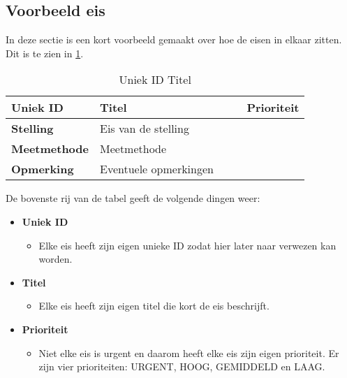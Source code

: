 \newpage

\subsection{Voorbeeld eis}

In deze sectie is een kort voorbeeld gemaakt over hoe de eisen in elkaar zitten. Dit is te zien in \ref{tab:Uniek ID}.

\newcommand{\eistabel}[6]{
	\begin{table}[H]
		\centering
		\caption{#1 #2}
		\label{tab:#1}
		\begin{tabular}{|p{0.15\linewidth}|p{0.5\linewidth}|p{0.2\linewidth}|}
			\hline
			\textbf{#1} & \textbf{#2} & \textbf{#3} \\
			\hline
			\textbf{Stelling} & \multicolumn{2}{p{0.7\linewidth}|}{#4}\\ 
			\hline
			\textbf{Meetmethode} & \multicolumn{2}{p{0.7\linewidth}|}{#5} \\ 
			\hline
			\textbf{Opmerking} & \multicolumn{2}{p{0.7\linewidth}|}{#6} \\ 
			\hline
		\end{tabular}
	\end{table}
}

\eistabel{Uniek ID}{Titel}{Prioriteit}{Eis van de stelling}{Meetmethode}{Eventuele opmerkingen}

De bovenste rij van de tabel geeft de volgende dingen weer:

\begin{itemize}
	\item \textbf{Uniek ID}
	\begin{itemize}
		\item Elke eis heeft zijn eigen unieke ID zodat hier later naar verwezen kan worden.
	\end{itemize}
	
	\item \textbf{Titel}
	\begin{itemize}
		\item Elke eis heeft zijn eigen titel die kort de eis beschrijft.
	\end{itemize}
	
	\item \textbf{Prioriteit}
	\begin{itemize}
		\item Niet elke eis is urgent en daarom heeft elke eis zijn eigen prioriteit. Er zijn vier prioriteiten: URGENT, HOOG, GEMIDDELD en LAAG.
	\end{itemize}
\end{itemize}

